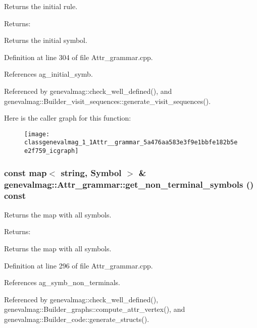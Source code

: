 Returns the initial rule. \begin{Desc}
\item[Returns:]\end{Desc}
Returns the initial symbol. 

Definition at line 304 of file Attr\_\-grammar.cpp.

References ag\_\-initial\_\-symb.

Referenced by genevalmag::check\_\-well\_\-defined(), and genevalmag::Builder\_\-visit\_\-sequences::generate\_\-visit\_\-sequences().

Here is the caller graph for this function:\nopagebreak
\begin{figure}[H]
\begin{center}
\leavevmode
\texttt{[image: classgenevalmag\_1\_1Attr\_\_grammar\_5a476aa583e3f9e1bbfe182b5ee2f759\_icgraph]}
\end{center}
\end{figure}
\hypertarget{classgenevalmag_1_1Attr__grammar_50a326649bbf48d2d715144cef59a75e}{
\subsubsection[{get\_\-non\_\-terminal\_\-symbols}]{\setlength{\rightskip}{0pt plus 5cm}const map$<$ string, {\bf Symbol} $>$ \& genevalmag::Attr\_\-grammar::get\_\-non\_\-terminal\_\-symbols () const}}
\label{classgenevalmag_1_1Attr__grammar_50a326649bbf48d2d715144cef59a75e}


Returns the map with all symbols. \begin{Desc}
\item[Returns:]\end{Desc}
Returns the map with all symbols. 

Definition at line 296 of file Attr\_\-grammar.cpp.

References ag\_\-symb\_\-non\_\-terminals.

Referenced by genevalmag::check\_\-well\_\-defined(), genevalmag::Builder\_\-graphs::compute\_\-attr\_\-vertex(), and genevalmag::Builder\_\-code::generate\_\-structs().


